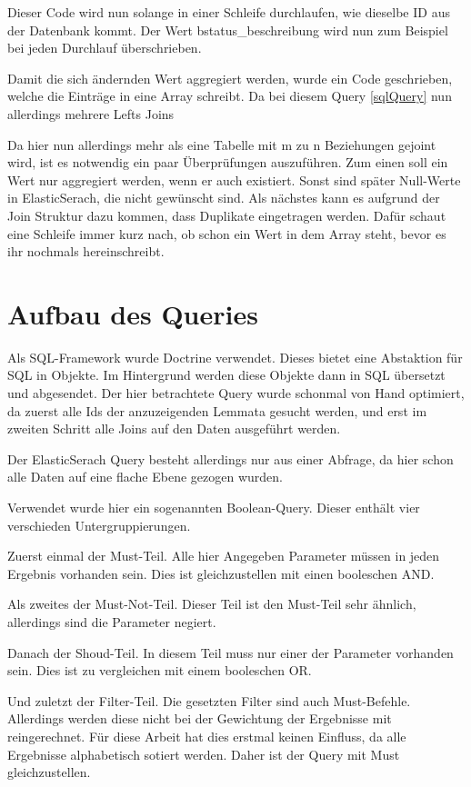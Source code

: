 Dieser Code wird nun solange in einer Schleife durchlaufen, wie dieselbe ID aus der Datenbank kommt. Der Wert bstatus\_beschreibung wird nun zum Beispiel bei jeden Durchlauf überschrieben. 

Damit die sich ändernden Wert aggregiert werden, wurde ein Code geschrieben, welche die Einträge in eine Array schreibt. Da bei diesem Query \ref{sqlQuery} nun allerdings mehrere Lefts Joins 

Da hier nun allerdings mehr als eine Tabelle mit m zu n Beziehungen gejoint wird, ist es notwendig ein paar Überprüfungen auszuführen. Zum einen soll ein Wert nur aggregiert werden, wenn er auch existiert. Sonst sind später Null-Werte in ElasticSerach, die nicht gewünscht sind. Als nächstes kann es aufgrund der Join Struktur dazu kommen, dass Duplikate eingetragen werden. Dafür schaut eine Schleife immer kurz nach, ob schon ein Wert in dem Array steht, bevor es ihr nochmals hereinschreibt. 

\section{Aufbau des Queries}

Als SQL-Framework wurde Doctrine verwendet. Dieses bietet eine Abstaktion für SQL in Objekte. Im Hintergrund werden diese Objekte dann in SQL übersetzt und abgesendet. Der hier betrachtete Query wurde schonmal von Hand optimiert, da zuerst alle Ids der anzuzeigenden Lemmata gesucht werden, und erst im zweiten Schritt alle Joins auf den Daten ausgeführt werden.

Der ElasticSerach Query besteht allerdings nur aus einer Abfrage, da hier schon alle Daten auf eine flache Ebene gezogen wurden.

Verwendet wurde hier ein sogenannten Boolean-Query. Dieser enthält vier verschieden Untergruppierungen.

Zuerst einmal der Must-Teil. Alle hier Angegeben Parameter müssen in jeden Ergebnis vorhanden sein. Dies ist gleichzustellen mit einen booleschen AND. 

Als zweites der Must-Not-Teil. Dieser Teil ist den Must-Teil sehr ähnlich, allerdings sind die Parameter negiert.

Danach der Shoud-Teil. In diesem Teil muss nur einer der Parameter vorhanden sein. Dies ist zu vergleichen mit einem booleschen OR. 

Und zuletzt der Filter-Teil. Die gesetzten Filter sind auch Must-Befehle. Allerdings werden diese nicht bei der Gewichtung der Ergebnisse mit reingerechnet. Für diese Arbeit hat dies erstmal keinen Einfluss, da alle Ergebnisse alphabetisch sotiert werden. Daher ist der Query mit Must gleichzustellen. \cite{ElasticsearchB.V..17.12.2019}


